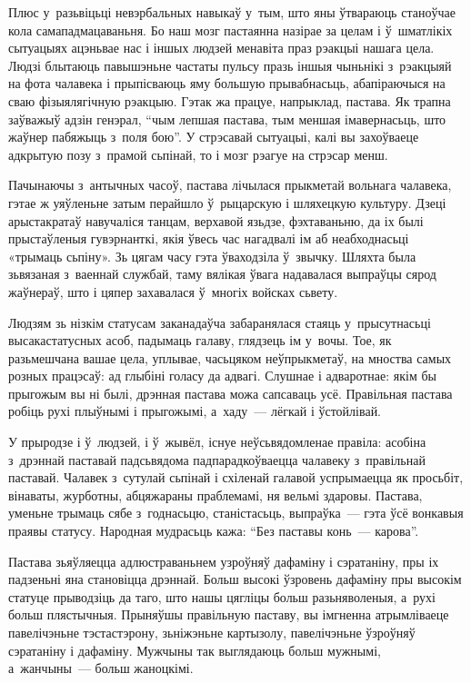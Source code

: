 Плюс у~разьвіцьці невэрбальных навыкаў у~тым, што яны ўтвараюць станоўчае кола самападмацаваньня. Бо наш мозг пастаянна назірае за целам і ў~шматлікіх сытуацыях ацэньвае нас і іншых людзей менавіта праз рэакцыі нашага цела. Людзі блытаюць павышэньне частаты пульсу празь іншыя чыньнікі з~рэакцыяй на фота чалавека і прыпісваюць яму большую прывабнасьць, абапіраючыся на сваю фізыялягічную рэакцыю. Гэтак жа працуе, напрыклад, пастава. Як трапна заўважыў адзін генэрал, ``чым лепшая пастава, тым меншая імавернасьць, што жаўнер пабяжыць з~поля бою''. У стрэсавай сытуацыі, калі вы захоўваеце адкрытую позу з~прамой сьпінай, то і мозг рэагуе на стрэсар менш.

Пачынаючы з~антычных часоў, пастава лічылася прыкметай вольнага чалавека, гэтае ж уяўленьне затым перайшло ў~рыцарскую і шляхецкую культуру. Дзеці арыстакратаў навучаліся танцам, верхавой язьдзе, фэхтаваньню, да іх былі прыстаўленыя гувэрнанткі, якія ўвесь час нагадвалі ім аб неабходнасьці «трымаць сьпіну». Зь цягам часу гэта ўваходзіла ў~звычку. Шляхта была зьвязаная з~ваеннай службай, таму вялікая ўвага надавалася выпраўцы сярод жаўнераў, што і цяпер захавалася ў~многіх войсках сьвету.

Людзям зь нізкім статусам заканадаўча забаранялася стаяць у~прысутнасьці высакастатусных асоб, падымаць галаву, глядзець ім у~вочы. Тое, як разьмешчана вашае цела, уплывае, часьцяком неўпрыкметаў, на мноства самых розных працэсаў: ад глыбіні голасу да адвагі. Слушнае і адваротнае: якім бы прыгожым вы ні былі, дрэнная пастава можа сапсаваць усё. Правільная пастава робіць рухі плыўнымі і прыгожымі, а~хаду~--- лёгкай і ўстойлівай.

У прыродзе і ў~людзей, і ў~жывёл, існуе неўсьвядомленае правіла: асобіна з~дрэннай паставай падсьвядома падпарадкоўваецца чалавеку з~правільнай паставай. Чалавек з~сутулай сьпінай і схіленай галавой успрымаецца як просьбіт, вінаваты, журботны, абцяжараны праблемамі, ня вельмі здаровы. Пастава, уменьне трымаць сябе з~годнасьцю, станістасьць, выпраўка~--- гэта ўсё вонкавыя праявы статусу. Народная мудрасьць кажа: ``Без паставы конь~--- карова''.

Пастава зьяўляецца адлюстраваньнем узроўняў дафаміну і сэратаніну, пры іх падзеньні яна становіцца дрэннай. Больш высокі ўзровень дафаміну пры высокім статуце прыводзіць да таго, што нашы цягліцы больш разьняволеныя, а~рухі больш плястычныя. Прыняўшы правільную паставу, вы імгненна атрымліваеце павелічэньне тэстастэрону, зьніжэньне картызолу, павелічэньне ўзроўняў сэратаніну і дафаміну. Мужчыны так выглядаюць больш мужнымі, а~жанчыны~--- больш жаноцкімі.

